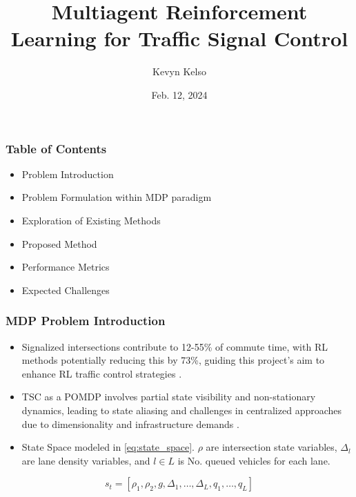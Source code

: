 \documentclass[compress,12pt]{beamer}
\title{Multiagent Reinforcement Learning for Traffic Signal Control}
\date{Feb. 12, 2024}
\author{Kevyn Kelso}
\institute{University of Colorado at Colorado Springs}
\begin{document}
\frame[plain]{\titlepage}


\begin{frame}[bg=arguelles.png]
      \frametitle{Table of Contents}
      \begin{itemize}
      \item Problem Introduction
      \item Problem Formulation within MDP paradigm
      \item Exploration of Existing Methods
      \item Proposed Method
      \item Performance Metrics
      \item Expected Challenges
      \end{itemize}
\end{frame}

\begin{frame}[bg=arguelles.png]
      \frametitle{MDP Problem Introduction}
      \begin{itemize}
      \item Signalized intersections contribute to 12-55\% of commute time, with RL methods potentially reducing this by 73\%, guiding this project's aim to enhance RL traffic control strategies \cite{ault2021reinforcement}.
      \item TSC as a POMDP involves partial state visibility and non-stationary dynamics, leading to state aliasing and challenges in centralized approaches due to dimensionality and infrastructure demands\cite{Almeida2022MultiagentRL} \cite{DBLP:journals/corr/abs-2004-04778} \cite{choi1999environment}\cite{choi1999environment} \cite{10.3389/frai.2022.805823}\cite{DBLP:journals/corr/abs-2004-04778} \cite{ault2021reinforcement}.
      \item State Space modeled in \ref{eq:state_space}. \(\rho\) are intersection state variables, \(\Delta_l\) are lane density variables, and \(l \in L\) is No. queued vehicles for each lane.
      \end{itemize}

\begin{equation}
s_t = [\rho_1, \rho_2, g, \Delta_1, \ldots, \Delta_L, q_1, \ldots, q_L]
\label{eq:state_space}
\end{equation}

\end{frame}
\end{document}
